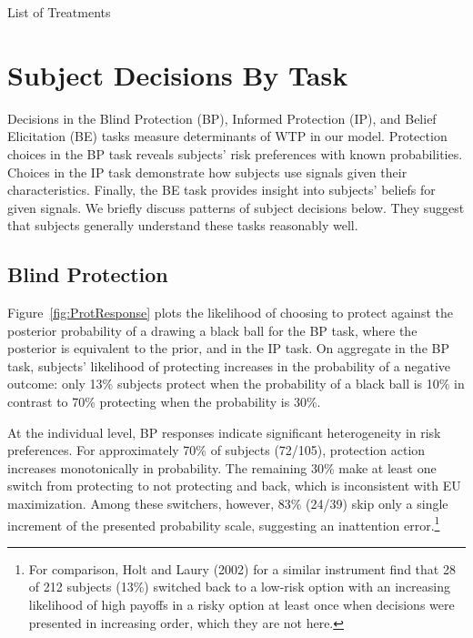 \documentclass[12pt,a4paper]{article}
\begin{document}
\begin{table}[h!]
\caption{List of Treatments} \label{tab:treatments}

\end{table}


 


\vspace{20pt}
\section{Subject Decisions By Task}\label{sec:sanity}

Decisions in the Blind Protection (BP), Informed Protection (IP), and Belief Elicitation (BE) tasks measure determinants of WTP in our model. Protection choices in the BP task reveals subjects' risk preferences with known probabilities. Choices in the IP task demonstrate how subjects use signals given their characteristics. Finally, the BE task provides insight into subjects' beliefs for given signals.  We briefly discuss patterns of subject decisions below. They suggest that subjects generally understand these tasks reasonably well.

\subsection{Blind Protection}

Figure~\ref{fig:ProtResponse} plots the likelihood of choosing to protect against the posterior probability of a drawing a black ball for the BP task, where the posterior is equivalent to the prior, and in the IP task. On aggregate in the BP task, subjects' likelihood of protecting increases in the probability of a negative outcome: only 13\% subjects protect when the probability of a black ball is 10\% in contrast to 70\% protecting when the probability is 30\%. 

At the individual level, BP responses indicate significant heterogeneity in risk preferences. For approximately 70\% of subjects (72/105), protection action increases monotonically in probability. The remaining 30\% make at least one switch from protecting to not protecting and back, which is inconsistent with EU maximization. Among these switchers, however, 83\% (24/39) skip only a single increment of the presented probability scale, suggesting an inattention error.\footnote{For comparison, Holt and Laury (2002) for a similar instrument find that 28 of 212 subjects (13\%) switched back to a low-risk option with an increasing likelihood of high payoffs in a risky option at least once when decisions were presented in increasing order, which they are not here.} 
\end{document}
